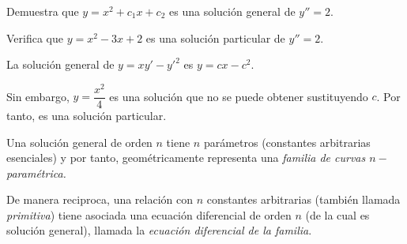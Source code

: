
	\begin{resuelto}
		\label{exmp 02:06}
		Demuestra que $ y=x^{2}+c_{1}x+c_{2} $ es una solución general de $ y''=2 $.
	\end{resuelto}

	\begin{resuelto}
		\label{exmp 02:08}
		Verifica que $ y = x^2-3x+2 $ es una solución particular de $ y''=2 $.
	\end{resuelto}

	\begin{ejemplo}
		La solución general de $ y = xy'-y'^{2} $ es $ y = cx-c^{2} $.

		 Sin embargo, $ y=\dfrac{x^{2}}{4} $ es una solución que no se puede obtener sustituyendo $ c $.  Por tanto, es una solución particular.
	\end{ejemplo}


\begin{definicion}
	Una solución general de orden $ n $ tiene $ n $ parámetros (constantes arbitrarias esenciales) y por tanto, geométricamente representa una \emph{familia de curvas $n-$paramétrica. }

	De manera reciproca, una relación con $ n $ constantes arbitrarias (también llamada \emph{primitiva}) tiene asociada una ecuación diferencial de orden $n$ (de la cual es solución general), llamada la \emph{ecuación diferencial de la familia}.

\end{definicion}

